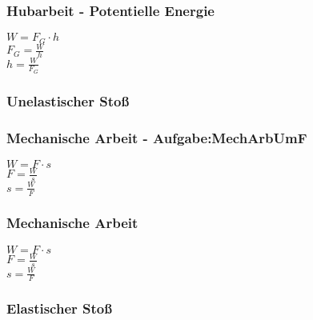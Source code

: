 \subsubsection{Hubarbeit - Potentielle Energie} 
\begin{minipage}{0.45\textwidth} 
$ W = F_{G} \cdot h $\\ 
$ F_{G}  = \frac{W}{h} $\\ 
$ h = \frac{W}{F_{G} } $\\ 
\end{minipage} 
\begin{minipage}{0.45\textwidth} 
 
\end{minipage} 
\subsubsection{Unelastischer Stoß} 
\begin{minipage}{0.45\textwidth} 
\end{minipage} 
\begin{minipage}{0.45\textwidth} 
 
\end{minipage} 
\subsubsection{Mechanische Arbeit - Aufgabe:MechArbUmF} 
\begin{minipage}{0.45\textwidth} 
$ W = F\cdot s $\\ 
$ F = \frac{W}{s} $\\ 
$ s = \frac{W}{F} $\\ 
\end{minipage} 
\begin{minipage}{0.45\textwidth} 
 
\end{minipage} 
\subsubsection{Mechanische Arbeit} 
\begin{minipage}{0.45\textwidth} 
$ W = F\cdot s $\\ 
$ F = \frac{W}{s} $\\ 
$ s = \frac{W}{F} $\\ 
\end{minipage} 
\begin{minipage}{0.45\textwidth} 
 
\end{minipage} 
\subsubsection{Elastischer Stoß} 
\begin{minipage}{0.45\textwidth} 
\end{minipage} 
\begin{minipage}{0.45\textwidth} 
 
\end{minipage} 
